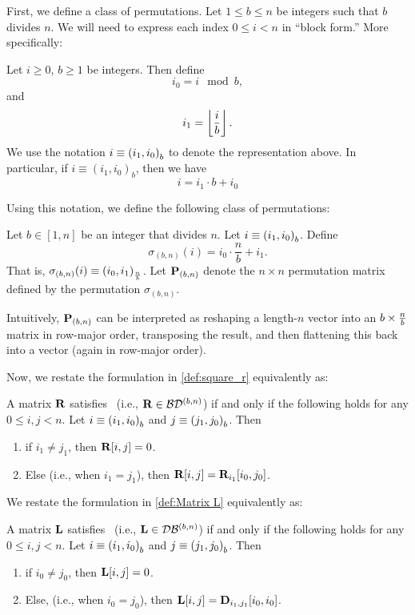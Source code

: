First, we define a class of permutations.
Let $1\le b\le n$ be integers such that $b$ divides $n$.
We will need to express each index $0\le i<n$ in ``block form.'' More specifically:

\begin{definition}\label{def:$i$}
Let $i \ge 0$, $b \ge 1$ be integers. Then define
\[i_0=i\mod{b},\]
and
\[i_1=\left \lfloor \frac ib \right \rfloor.\] 
We use the notation $i\equiv\left( {{i_1},{i_0}}\right)_{{b}}$ to denote the representation above. In particular, if $i\equiv(i_1,i_0)_{b}$,
then we have
\[
        i = i_1 \cdot b + i_0
\]
\end{definition}

Using this notation, we define the following class of permutations:
\begin{definition}
\label{def:sigma-b}
Let $b \in [1, n]$ be an integer that divides $n$.  Let $i\equiv\left( {{i_1},{i_0}}\right)_{{b}}$. Define
    \begin{equation}
            \label{eq:sigma_b-def}
        \sigma_{(b,n)}(i) = i_0\cdot\frac{n}{b} + i_1.
    \end{equation}
That is, $\sigma_{(b,n)}(i)\equiv \left( {{i_0},{i_1}}\right)_{{\frac {n}{b}}}$.
Let $\mathbf{P}_{(b,n)}$ denote the $n \times n$ permutation matrix defined by the permutation $\sigma_{(b,n)}$.
\end{definition}
Intuitively, $\mathbf{P}_{(b,n)}$ can be interpreted as reshaping a length-$n$ vector into an $b \times \tfrac{n}{b}$ matrix in row-major order, transposing the result, and then flattening this back into a vector (again in row-major order).


Now, we restate the formulation in \cref{def:square_r} equivalently as:
\begin{proposition}

\label{prop:R-eqv-def}
A matrix $\mathbf{R}$ satisfies~ (i.e., $\mathbf{R} \in \mathcal{B}\mathcal{D}^{(b,n)}$) if and only if the following holds for any
$0\le i,j< n$. Let $i\equiv\left( {{i_1},{i_0}}\right)_{{b}}$ and $j\equiv\left( {{j_1},{j_0}}\right)_{{b}}$.  Then
\begin{enumerate}
    \item\label{item:zero-loc-R} if $i_1\ne j_1$, then $\mathbf{R}[i,j]=0$. 
    \item \label{item:nonzero-loc-R} Else (i.e., when $i_1=j_1$), then $\mathbf{R}[i,j]=\mathbf{R}_{i_1}[i_0,j_0]$.
\end{enumerate}

\end{proposition}



We restate the formulation in \cref{def:Matrix L} equivalently as:
\begin{proposition}
\label{prop:L-eqv-def}
A matrix $\mathbf{L}$ satisfies~ (i.e., $\mathbf{L} \in \mathcal{D}\mathcal{B}^{(b,n)}$) if and only if the following holds for any
$0\le i,j< n$. Let $i\equiv\left( {{i_1},{i_0}}\right)_{{b}}$ and $j\equiv\left( {{j_1},{j_0}}\right)_{{b}}$. Then 
\begin{enumerate}
    \item\label{item:zero-loc-L} if $i_0\ne j_0$, then $\mathbf{L}[i,j]=0$. 
    \item \label{item:nonzero-loc-L} Else, (i.e., when $i_0=j_0$), then $\mathbf{L}[i,j]=\mathbf{D}_{i_1,j_1}[i_0,i_0]$.
\end{enumerate}
\end{proposition}

